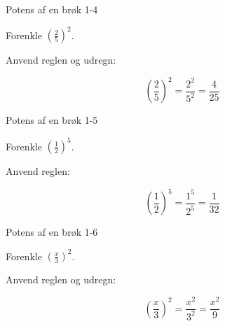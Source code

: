 \documentclass{article}
\begin{document}
\newpage

\begin{exercise}{Potens af en brøk 1-4}

Forenkle $\left(\frac{2}{5}\right)^2$.


\hint

Anvend reglen og udregn:

\hint
\[
\left(\frac{2}{5}\right)^2 = \frac{2^2}{5^2} = \frac{4}{25}
\]

\end{exercise}

\newpage

\begin{exercise}{Potens af en brøk 1-5}

Forenkle $\left(\frac{1}{2}\right)^5$.


\hint

Anvend reglen:

\hint
\[
\left(\frac{1}{2}\right)^5 = \frac{1^5}{2^5} = \frac{1}{32}
\]

\end{exercise}

\newpage

\begin{exercise}{Potens af en brøk 1-6}

Forenkle $\left(\frac{x}{3}\right)^2$.


\hint

Anvend reglen og udregn:

\hint
\[
\left(\frac{x}{3}\right)^2 = \frac{x^2}{3^2} = \frac{x^2}{9}
\]

\end{exercise}
\end{document}
